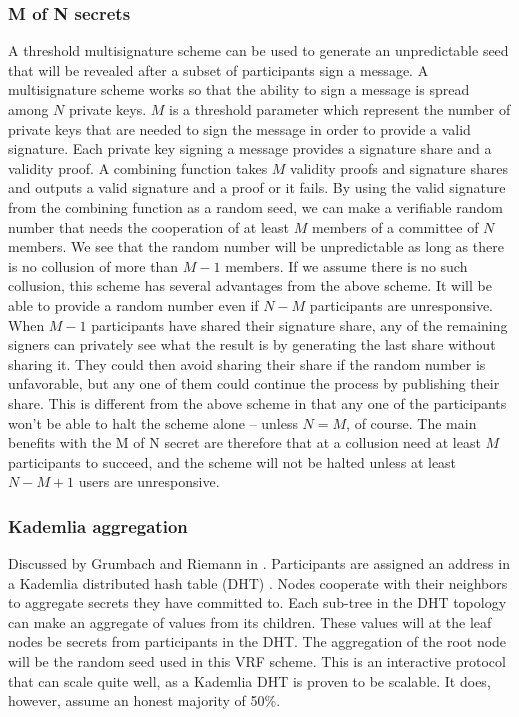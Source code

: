 \subsubsection{M of N secrets}
A threshold multisignature scheme can be used to generate an unpredictable seed that will be revealed after a subset of participants sign a message.
A multisignature scheme works so that the ability to sign a message is spread among $N$ private keys. $M$ is a threshold parameter which represent the number of private keys that are needed to sign the message in order to provide a valid signature. Each private key signing a message provides a signature share and a validity proof. A combining function takes $M$ validity proofs and signature shares and outputs a valid signature and a proof or it fails. By using the valid signature from the combining function as a random seed, we can make a verifiable random number that needs the cooperation of at least $M$ members of a committee of $N$ members.  
We see that the random number will be unpredictable as long as there is no collusion of more than $M-1$ members. If we assume there is no such collusion, this scheme has several advantages from the above scheme. It will be able to provide a random number even if $N-M$ participants are unresponsive. When $M-1$ participants have shared their signature share, any of the remaining signers can privately see what the result is by generating the last share without sharing it. They could then avoid sharing their share if the random number is unfavorable, but any one of them could continue the process by publishing their share. This is different from the above scheme in that any one of the participants won't be able to halt the scheme alone – unless $N=M$, of course. The main benefits with the M of N secret are therefore that at a collusion need at least $M$ participants to succeed, and the scheme will not be halted unless at least $N - M + 1$ users are unresponsive.

\subsubsection{Kademlia aggregation}
Discussed by Grumbach and Riemann in \cite{grumbach_distributed_2017}. Participants are assigned an address in a Kademlia distributed hash table (DHT) \cite{maymounkov_kademlia_2002}. Nodes cooperate with their neighbors to aggregate secrets they have committed to. Each sub-tree in the DHT topology can make an aggregate of values from its children. These values will at the leaf nodes be secrets from participants in the DHT. The aggregation of the root node will be the random seed used in this VRF scheme. 
This is an interactive protocol that can scale quite well, as a Kademlia DHT is proven to be scalable. It does, however, assume an honest majority of 50\%. 

